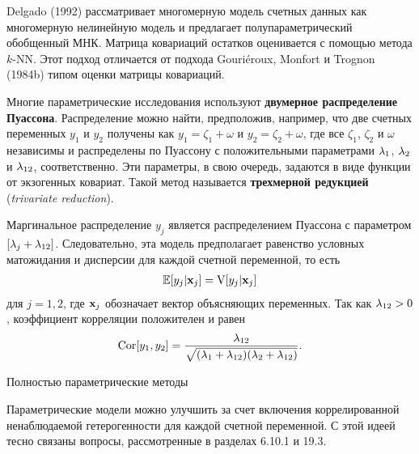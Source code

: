 Delgado (1992) рассматривает многомерную модель счетных данных как многомерную нелинейную модель и предлагает полупараметрический обобщенный МНК. Матрица ковариаций остатков оценивается с помощью метода $k$-NN. Этот подход отличается от подхода Gouri\'eroux, Monfort и Trognon (1984b) типом оценки матрицы ковариаций.

Многие параметрические исследования используют \textbf{двумерное распределение Пуассона}. Распределение можно найти, предположив, например, что две счетных переменных $y_1$ и $y_2$ получены как $y_1 = \zeta_1 + \omega$ и $y_2 = \zeta_2 + \omega$, где все $\zeta_1$, $\zeta_2$ и $\omega$ независимы и распределены по Пуассону с положительными параметрами $\lambda_1$, $\lambda_2$ и $\lambda_{12}$, соответственно. Эти параметры, в свою очередь, задаются в виде функции от экзогенных ковариат. Такой метод называется \textbf{трехмерной редукцией} (\textit{trivariate reduction}).

Маргинальное распределение $y_j$ является распределением Пуассона с параметром $[\lambda_j + \lambda_{12}]$.
Следовательно, эта модель предполагает равенство условных матожидания и дисперсии для каждой счетной переменной, то есть
    \begin{align}\label{eq:20.21}
    \mathbb{E}[y_j|\mathbf{x}_j] = \mathrm{V}[y_j|\mathbf{x}_j]
    \end{align}
для $j = 1, 2$, где $\mathbf{x}_j$ обозначает вектор объясняющих переменных. Так как $\lambda_{12} > 0$, коэффициент корреляции положителен и равен
    \begin{align}\label{eq:20.22}
    \mathrm{Cor}[y_1, y_2] = \frac{\lambda_{12}}{\sqrt{(\lambda_1 + \lambda_{12})(\lambda_2 + \lambda_{12})}}.
    \end{align}


        \begin{center}{Полностью параметрические методы}\end{center}
        \noindent
Параметрические модели можно улучшить за счет включения коррелированной ненаблюдаемой гетерогенности для каждой счетной переменной. С этой идеей тесно связаны вопросы, рассмотренные в разделах 6.10.1 и 19.3.

